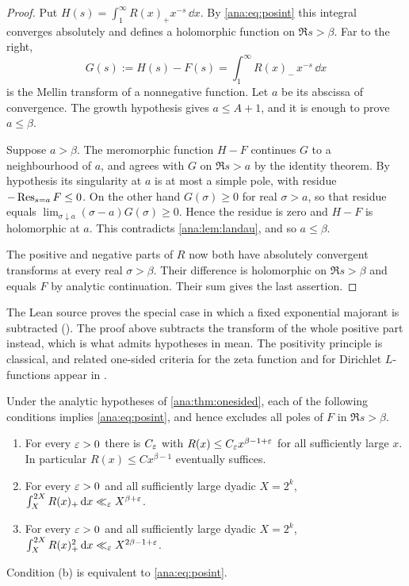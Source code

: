 \begin{proof}
Put $H(s)=\int_1^\infty R(x)_+x^{-s}\,\dd x$. By \eqref{ana:eq:posint} this integral converges
absolutely and defines a holomorphic function on $\Re s>\beta$. Far to the right,
\[
 G(s):=H(s)-F(s)=\int_1^\infty R(x)_-\,x^{-s}\,\dd x
\]
is the Mellin transform of a nonnegative function. Let $a$ be its abscissa of convergence. The
growth hypothesis gives $a\le A+1$, and it is enough to prove $a\le\beta$.

Suppose $a>\beta$. The meromorphic function $H-F$ continues $G$ to a neighbourhood of $a$, and
agrees with $G$ on $\Re s>a$ by the identity theorem. By hypothesis its singularity at $a$ is at
most a simple pole, with residue $-\operatorname{Res}_{s=a}F\le0$. On the other hand $G(\sigma)\ge0$ for real
$\sigma>a$, so that residue equals $\lim_{\sigma\downarrow a}(\sigma-a)G(\sigma)\ge0$. Hence the
residue is zero and $H-F$ is holomorphic at $a$. This contradicts \cref{ana:lem:landau}, and so
$a\le\beta$.

The positive and negative parts of $R$ now both have absolutely convergent transforms at every
real $\sigma>\beta$. Their difference is holomorphic on $\Re s>\beta$ and equals $F$ by analytic
continuation. Their sum gives the last assertion.
\end{proof}

The Lean source proves the special case in which a fixed exponential majorant is subtracted
(). The proof above subtracts the transform of the whole positive part
instead, which is what admits hypotheses in mean. The positivity principle is classical, and
related one-sided criteria for the zeta function and for Dirichlet $L$-functions appear in
\cite{Suzuki2025Variants}.

\begin{corollary}\label{ana:cor:forms}
Under the analytic hypotheses of \cref{ana:thm:onesided}, each of the following conditions
implies \eqref{ana:eq:posint}, and hence excludes all poles of $F$ in $\Re s>\beta$.
\begin{enumerate}[label=\textup{(\alph*)}]
\item For every $\varepsilon>0$ there is $C_\varepsilon$ with $R(x)\le C_\varepsilon x^{\beta-1+\varepsilon}$ for all
 sufficiently large $x$. In particular $R(x)\le Cx^{\beta-1}$ eventually suffices.
\item For every $\varepsilon>0$ and all sufficiently large dyadic $X=2^k$,
 $\int_X^{2X}R(x)_+\,\mathrm{d} x\ll_\varepsilon X^{\beta+\varepsilon}$.
\item For every $\varepsilon>0$ and all sufficiently large dyadic $X=2^k$,
 $\int_X^{2X}R(x)_+^2\,\mathrm{d} x\ll_\varepsilon X^{2\beta-1+\varepsilon}$.
\end{enumerate}
Condition \textup{(b)} is equivalent to \eqref{ana:eq:posint}.
\end{corollary}

